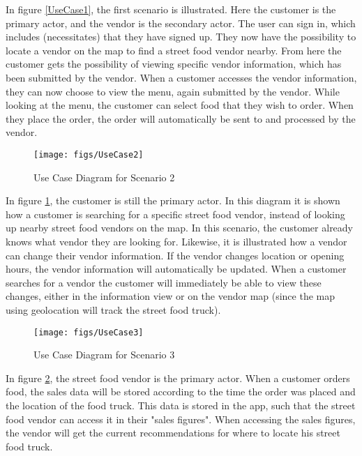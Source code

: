 In figure \ref{UseCase1}, the first scenario is illustrated. Here the customer is the primary actor, and the vendor is the secondary actor. The user can sign in, which includes (necessitates) that they have signed up. They now have the possibility to locate a vendor on the map to find a street food vendor nearby. From here the customer gets the possibility of viewing specific vendor information, which has been submitted by the vendor. When a customer accesses the vendor information, they can now choose to view the menu, again submitted by the vendor. While looking at the menu, the customer can select food that they wish to order. When they place the order, the order will automatically be sent to and processed by the vendor.
\pagebreak

\begin{figure}[!h]
\centering
\texttt{[image: figs/UseCase2]}
\caption{Use Case Diagram for Scenario 2}
\label{UseCase2}
\end{figure}

In figure \ref{UseCase2}, the customer is still the primary actor. In this diagram it is shown how a customer is searching for a specific street food vendor, instead of looking up nearby street food vendors on the map. In this scenario, the customer already knows what vendor they are looking for. Likewise, it is illustrated how a vendor can change their vendor information. If the vendor changes location or opening hours, the vendor information will automatically be updated. When a customer searches for a vendor the customer will immediately be able to view these changes, either in the information view or on the vendor map (since the map using geolocation will track the street food truck).
\pagebreak

\begin{figure}[!h]
\centering
\texttt{[image: figs/UseCase3]}
\caption{Use Case Diagram for Scenario 3}
\label{UseCase3}
\end{figure}

In figure \ref{UseCase3}, the street food vendor is the primary actor. When a customer orders food, the sales data will be stored according to the time the order was placed and the location of the food truck. This data is stored in the app, such that the street food vendor can access it in their "sales figures". When accessing the sales figures, the vendor will get the current recommendations for where to locate his street food truck.

